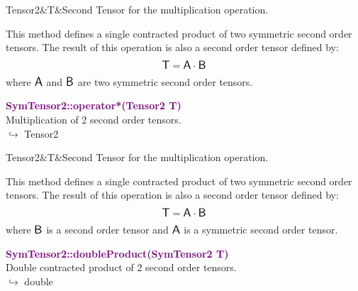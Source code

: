 \begin{tcolorbox}[width=\textwidth,myArgs,tabularx={ll|R},title=Arguments of SymTensor2::operator*]
Tensor2&T&Second Tensor for the multiplication operation.
\end{tcolorbox}

This method defines a single contracted product of two symmetric second order tensors.
The result of this operation is also a second order tensor defined by:
\begin{equation*}
\mbox{\large\ensuremath{\mathsf{T}}} = \mbox{\large\ensuremath{\mathsf{A}}} \cdot \mbox{\large\ensuremath{\mathsf{B}}}
\end{equation*}
where $\mbox{\large\ensuremath{\mathsf{A}}}$ and $\mbox{\large\ensuremath{\mathsf{B}}}$ are two symmetric second order tensors.

\textcolor{purple}{\textbf{SymTensor2::operator*(Tensor2 T)}}\label{SymTensor2::operator*(Tensor2 T)}\\
Multiplication of 2 second order tensors.\\ \hspace*{10mm}$\hookrightarrow$ Tensor2

\begin{tcolorbox}[width=\textwidth,myArgs,tabularx={ll|R},title=Arguments of SymTensor2::operator*]
Tensor2&T&Second Tensor for the multiplication operation.
\end{tcolorbox}

This method defines a single contracted product of two symmetric second order tensors.
The result of this operation is also a second order tensor defined by:
\begin{equation*}
\mbox{\large\ensuremath{\mathsf{T}}} = \mbox{\large\ensuremath{\mathsf{A}}} \cdot \mbox{\large\ensuremath{\mathsf{B}}}
\end{equation*}
where $\mbox{\large\ensuremath{\mathsf{B}}}$ is a second order tensor and $\mbox{\large\ensuremath{\mathsf{A}}}$ is a symmetric second order tensor.

\textcolor{purple}{\textbf{SymTensor2::doubleProduct(SymTensor2 T)}}\label{SymTensor2::doubleProduct(SymTensor2 T)}\\
Double contracted product of 2 second order tensors.\\ \hspace*{10mm}$\hookrightarrow$ double

